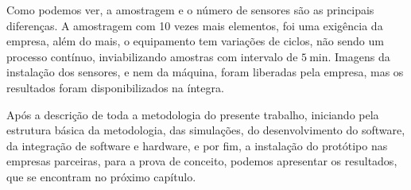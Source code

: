Como podemos ver, a amostragem e o número de sensores são as principais diferenças. A amostragem com 10 vezes mais elementos, foi uma exigência
da empresa, além do mais, o equipamento tem variações de ciclos, não sendo um processo contínuo, inviabilizando amostras com intervalo de 
$\SI{5}{\minute}$. Imagens da instalação dos sensores, e nem da máquina, foram liberadas pela empresa, mas os resultados foram 
disponibilizados na íntegra.

Após a descrição de toda a metodologia do presente trabalho, iniciando pela estrutura básica da metodologia, das simulações, do desenvolvimento
do software, da integração de software e hardware, e por fim, a instalação do protótipo nas empresas parceiras, para a prova de conceito, 
podemos apresentar os resultados, que se encontram no próximo capítulo.